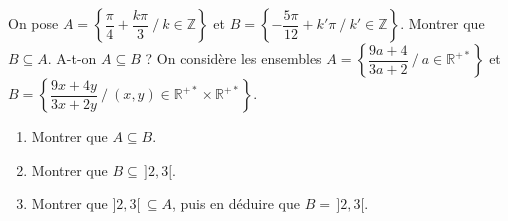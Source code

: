 On pose $A=\left\{\dfrac\pi4+\dfrac{k\pi}{3}\ /\ k\in\mathbb{Z}\right\}$ et $B=\left\{-\dfrac{5\pi}{12}+k'\pi\ /\ k'\in\mathbb{Z}\right\}$.
Montrer que $B\subseteq A$. A-t-on $A\subseteq B$ ?
\fin
{}
On considère les ensembles $A=\left\{\dfrac{9a+4}{3a+2}\ /\ a\in\mathbb{R}^{+*}\right\}$ et $B=\left\{\dfrac{9x+4y}{3x+2y}\ /\ (x,y)\in\mathbb{R}^{+*}\times\mathbb{R}^{+*}\right\}$.
\begin{enumerate}
\item Montrer que $A\subseteq B$.
\item Montrer que $B\subseteq\,]2,3[$.
\item Montrer que $]2,3[\,\subseteq A$, puis en déduire que $B=\,]2,3[$.
\end{enumerate}
\fin
